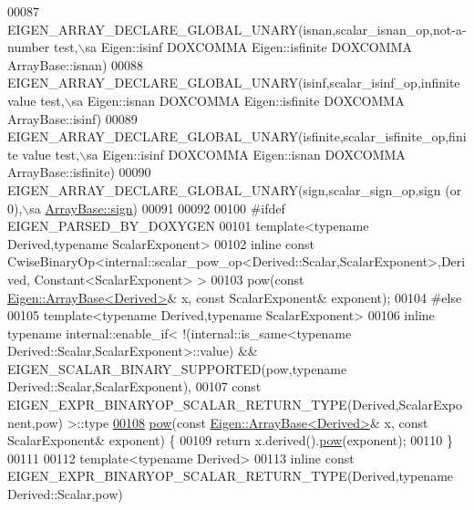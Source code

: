 \begin{DoxyCode}
00087   EIGEN\_ARRAY\_DECLARE\_GLOBAL\_UNARY(isnan,scalar\_isnan\_op,not-a-number test,\(\backslash\)sa Eigen::isinf DOXCOMMA 
      Eigen::isfinite DOXCOMMA ArrayBase::isnan)
00088   EIGEN\_ARRAY\_DECLARE\_GLOBAL\_UNARY(isinf,scalar\_isinf\_op,infinite value test,\(\backslash\)sa Eigen::isnan DOXCOMMA 
      Eigen::isfinite DOXCOMMA ArrayBase::isinf)
00089   EIGEN\_ARRAY\_DECLARE\_GLOBAL\_UNARY(isfinite,scalar\_isfinite\_op,finite value test,\(\backslash\)sa Eigen::isinf DOXCOMMA 
      Eigen::isnan DOXCOMMA ArrayBase::isfinite)
00090   EIGEN\_ARRAY\_DECLARE\_GLOBAL\_UNARY(sign,scalar\_sign\_op,sign (or 0),\(\backslash\)sa 
      \hyperlink{group___core___module_a756077be83779c575e95deb4361a6dd6}{ArrayBase::sign})
00091   
00092   
00100 \textcolor{preprocessor}{#ifdef EIGEN\_PARSED\_BY\_DOXYGEN}
00101   \textcolor{keyword}{template}<\textcolor{keyword}{typename} Derived,\textcolor{keyword}{typename} ScalarExponent>
00102   \textcolor{keyword}{inline} \textcolor{keyword}{const} CwiseBinaryOp<internal::scalar\_pow\_op<Derived::Scalar,ScalarExponent>,Derived,
      Constant<ScalarExponent> >
00103   pow(\textcolor{keyword}{const} \hyperlink{group___core___module_class_eigen_1_1_array_base}{Eigen::ArrayBase<Derived>}& x, \textcolor{keyword}{const} ScalarExponent& exponent);
00104 \textcolor{preprocessor}{#else}
00105   \textcolor{keyword}{template}<\textcolor{keyword}{typename} Derived,\textcolor{keyword}{typename} ScalarExponent>
00106   \textcolor{keyword}{inline} \textcolor{keyword}{typename} internal::enable\_if<   !(internal::is\_same<typename
       Derived::Scalar,ScalarExponent>::value) && EIGEN\_SCALAR\_BINARY\_SUPPORTED(pow,\textcolor{keyword}{typename} Derived::Scalar,ScalarExponent),
00107           \textcolor{keyword}{const} EIGEN\_EXPR\_BINARYOP\_SCALAR\_RETURN\_TYPE(Derived,ScalarExponent,pow) >::type
\hyperlink{group___core___module_ab6dc101d82e8228a19a8840e3a29c1c9}{00108}   \hyperlink{group___core___module_ab6dc101d82e8228a19a8840e3a29c1c9}{pow}(\textcolor{keyword}{const} \hyperlink{group___core___module_class_eigen_1_1_array_base}{Eigen::ArrayBase<Derived>}& x, \textcolor{keyword}{const} ScalarExponent& exponent) \{
00109     \textcolor{keywordflow}{return} x.derived().\hyperlink{group___core___module_ab6dc101d82e8228a19a8840e3a29c1c9}{pow}(exponent);
00110   \}
00111 
00112   \textcolor{keyword}{template}<\textcolor{keyword}{typename} Derived>
00113   \textcolor{keyword}{inline} \textcolor{keyword}{const} EIGEN\_EXPR\_BINARYOP\_SCALAR\_RETURN\_TYPE(Derived,\textcolor{keyword}{typename} Derived::Scalar,pow)

\end{DoxyCode}
